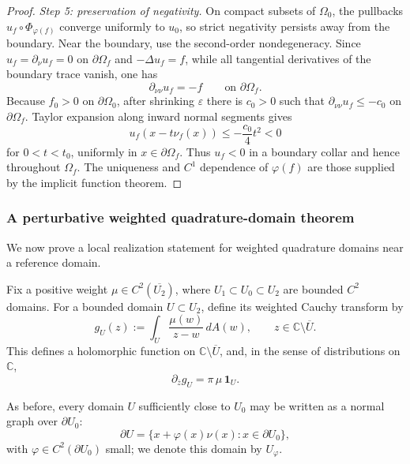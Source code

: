 \documentclass[a4paper,11pt,reqno]{amsart}
\numberwithin{equation}{section}
\theoremstyle{plain} %
\theoremstyle{definition} %
\theoremstyle{remark}
\newcommand{\C}{\mathbb{C}}
\begin{document}
\begin{proof}
\medskip
\noindent\emph{Step 5: preservation of negativity.}
On compact subsets of \(\Omega_0\), the pullbacks
\(u_f\circ\Phi_{\varphi(f)}\) converge uniformly to \(u_0\), so strict
negativity persists away from the boundary. Near the boundary, use the
second-order nondegeneracy. Since \(u_f=\partial_\nu u_f=0\) on
\(\partial\Omega_f\) and \(-\Delta u_f=f\), while all tangential derivatives
of the boundary trace vanish, one has
\[
\partial_{\nu\nu}u_f=-f
\qquad\text{on }\partial\Omega_f .
\]
Because \(f_0>0\) on \(\partial\Omega_0\), after shrinking \(\varepsilon\)
there is \(c_0>0\) such that
\(\partial_{\nu\nu}u_f\le -c_0\) on \(\partial\Omega_f\). Taylor expansion
along inward normal segments gives
\[
u_f(x-t\nu_f(x))\le -\frac{c_0}{4}t^2<0
\]
for \(0<t<t_0\), uniformly in \(x\in\partial\Omega_f\). Thus \(u_f<0\) in a
boundary collar and hence throughout \(\Omega_f\). The uniqueness and \(C^1\)
dependence of \(\varphi(f)\) are those supplied by the implicit function
theorem.
\end{proof}

\subsubsection{A perturbative weighted quadrature-domain theorem}\label{app:cherednichenko-type}

We now prove a local realization statement for weighted quadrature domains near a
reference domain.

Fix a positive weight \(\mu\in C^2(\overline{U_2})\), where
\(U_1\subset U_0\subset U_2\) are bounded \(C^2\) domains. For a bounded domain
\(U\subset U_2\), define its weighted Cauchy transform by
\[
g_U(z):=\int_U \frac{\mu(w)}{z-w}\,dA(w),
\qquad z\in \C\setminus \overline U.
\]
This defines a holomorphic function on $\C\setminus \overline U$, and, in the sense of distributions on $\C$,
\[
\partial_{\overline z} g_U = \pi\,\mu\,\mathbf{1}_U.
\]

As before, every domain \(U\) sufficiently close to \(U_0\) may be written as a
normal graph over \(\partial U_0\):
\[
\partial U
=
\{x+\varphi(x)\nu(x):x\in \partial U_0\},
\]
with \(\varphi\in C^2(\partial U_0)\) small; we denote this domain by \(U_\varphi\).
\end{document}
